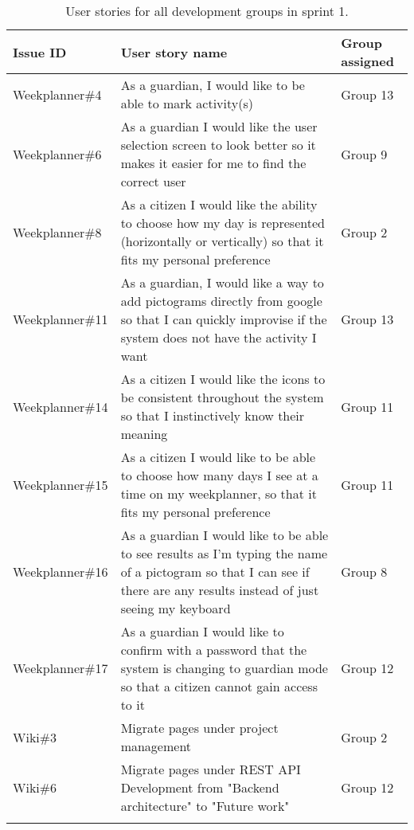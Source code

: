 \begin{longtable}{|p{2.8cm}|p{8cm}|p{2cm}|}
    \hline
    Issue ID        & User story name                                                                                                                                                          & Group assigned       \\ \hline
    Weekplanner\#4  & As a guardian, I would like to be able to mark activity(s)                                                                                                               & Group 13             \\ \hline
    Weekplanner\#6  & As a guardian I would like the user selection screen to look better so it makes it easier for me to find the correct user                                                & Group 9              \\ \hline
    Weekplanner\#8  & As a citizen I would like the ability to choose how my day is represented (horizontally or vertically) so that it fits my personal preference                            & Group 2              \\ \hline
    Weekplanner\#11 & As a guardian, I would like a way to add pictograms directly from google so that I can quickly improvise if the system does not have the activity I want                 & Group 13             \\ \hline
    Weekplanner\#14 & As a citizen I would like the icons to be consistent throughout the system so that I instinctively know their meaning                                                    & Group 11             \\ \hline
    Weekplanner\#15 & As a citizen I would like to be able to choose how many days I see at a time on my weekplanner, so that it fits my personal preference                                   & Group 11             \\ \hline
    Weekplanner\#16 & As a guardian I would like to be able to see results as I'm typing the name of a pictogram so that I can see if there are any results instead of just seeing my keyboard & Group 8              \\ \hline
    Weekplanner\#17 & As a guardian I would like to confirm with a password that the system is changing to guardian mode so that a citizen cannot gain access to it                            & Group 12             \\ \hline
    Wiki\#3         & Migrate pages under project management                                                                                                                                   & Group 2              \\ \hline
    Wiki\#6         & Migrate pages under REST API Development from "Backend architecture" to "Future work"                                                                                    & Group 12             \\ \hline
    \caption{User stories for all development groups in sprint 1.}\label{table:user-stories-sprint-1-updated}
\end{longtable}


